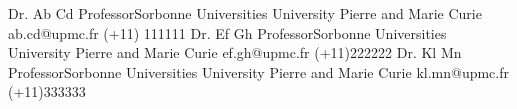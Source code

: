 %
%
%

\begin{referees}
		{Dr. Ab Cd}
		{Professor}{Sorbonne Universities}
		{University Pierre and Marie Curie}{}
		{ab.cd@upmc.fr}
		{(+11) 111111}
		{Dr. Ef Gh}
		{Professor}{Sorbonne Universities}
		{University Pierre and Marie Curie}{}
		{ef.gh@upmc.fr}
		{(+11)222222}
		{Dr. Kl Mn}
		{Professor}{Sorbonne Universities}
		{University Pierre and Marie Curie}{}
		{kl.mn@upmc.fr}
		{(+11)333333}
\end{referees}

